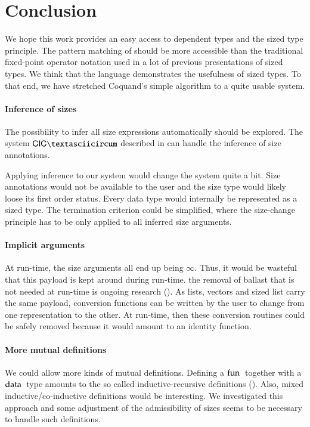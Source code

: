 \chapter{Conclusion}
We hope this work provides an easy access to dependent types and the sized type principle.
The pattern matching of \mugda should be more accessible than the traditional fixed-point operator
notation used in a lot of previous presentations of sized types.
We think that the \mugda language demonstrates the usefulness of sized types.
To that end, we have stretched Coquand's simple algorithm to a quite usable system.
\subsubsection{Inference of sizes}
The possibility to infer all size expressions automatically should be explored.
The system $\mathsf{CIC\textasciicircum}$ described in \cite{bgp:lpar06} can handle the inference of size annotations. 

Applying inference to our system would change the system quite a bit.
Size annotations would not be available to the user and the size type would likely loose its first order status. Every data type would internally be represented as a sized type. The termination criterion could be simplified, where the size-change principle has to be only applied to all inferred size arguments.
\subsubsection{Implicit arguments}
At run-time, the size arguments all end up being $\infty$.
Thus, it would be wasteful that this payload is kept around during run-time. 
the removal of ballast that is not needed at run-time is ongoing research (\cite{miquel01implicit,DBLP:conf/types/BradyMM03}).
As lists, vectors and sized list carry the same payload, conversion functions can be written by the user to change from one representation to the other. At run-time, then these conversion routines could be safely removed because it would amount to an identity function.
\subsubsection{More mutual definitions}
We could allow more kinds of mutual definitions.
Defining a $\mathrm{fun}\:$ together with a $\mathrm{data}\:$ type amounts to the so called inductive-recursive definitions (\cite{dybjer01indexed}).
Also, mixed inductive/co-inductive definitions would be interesting. We investigated this approach and some adjustment of the admissibility of sizes seems to be necessary to handle such definitions.
